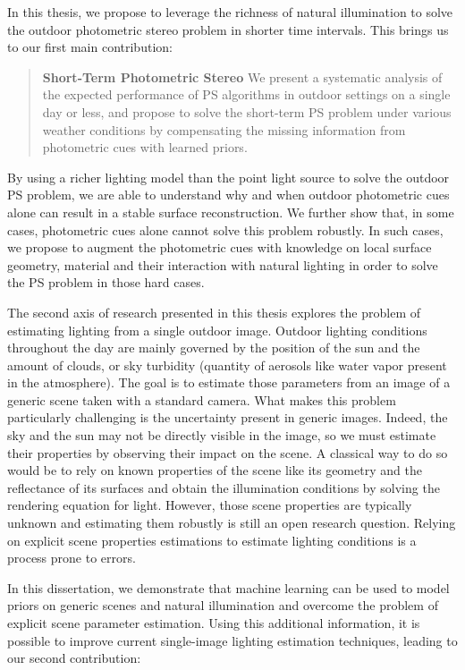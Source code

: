 In this thesis, we propose to leverage the richness of natural illumination to solve the outdoor photometric stereo problem in shorter time intervals. This brings us to our first main contribution: 

\begin{quotation}
\textbf{Short-Term Photometric Stereo} We present a systematic analysis of the expected performance of PS algorithms in outdoor settings on a single day or less, and propose to solve the short-term PS problem under various weather conditions by compensating the missing information from photometric cues with learned priors. 
\end{quotation}

By using a richer lighting model than the point light source to solve the outdoor PS problem, we are able to understand why and when outdoor photometric cues alone can result in a stable surface reconstruction. We further show that, in some cases, photometric cues alone cannot solve this problem robustly. In such cases, we propose to augment the photometric cues with knowledge on local surface geometry, material and their interaction with natural lighting in order to solve the PS problem in those hard cases. 

The second axis of research presented in this thesis explores the problem of estimating lighting from a single outdoor image. Outdoor lighting conditions throughout the day are mainly governed by the position of the sun and the amount of clouds, or sky turbidity (quantity of aerosols like water vapor present in the atmosphere). The goal is to estimate those parameters from an image of a generic scene taken with a standard camera. What makes this problem particularly challenging is the uncertainty present in generic images. Indeed, the sky and the sun may not be directly visible in the image, so we must estimate their properties by observing their impact on the scene. A classical way to do so would be to rely on known properties of the scene like its geometry and the reflectance of its surfaces and obtain the illumination conditions by solving the rendering equation for light. However, those scene properties are typically unknown and estimating them robustly is still an open research question. Relying on explicit scene properties estimations to estimate lighting conditions is a process prone to errors. 

In this dissertation, we demonstrate that machine learning can be used to model priors on generic scenes and natural illumination and overcome the problem of explicit scene parameter estimation. Using this additional information, it is possible to improve current single-image lighting estimation techniques, leading to our second contribution: 

